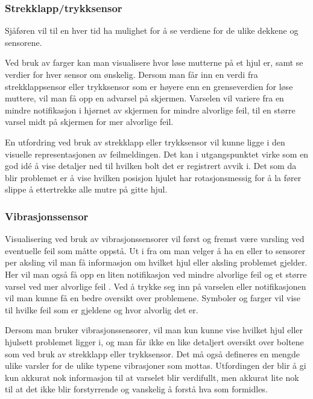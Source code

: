 \subsubsection{Strekklapp/trykksensor}
Sjåføren vil til en hver tid ha mulighet for å se verdiene for de ulike dekkene 
og sensorene. 

Ved bruk av farger kan man visualisere hvor løse mutterne på et hjul er, samt se 
verdier for hver sensor om ønskelig. Dersom man får inn en verdi fra 
strekklappsensor eller trykksensor som er høyere enn en grenseverdien for løse 
muttere, vil man få opp en advarsel på skjermen. Varselen vil variere fra en 
mindre notifikasjon i hjørnet av skjermen for mindre alvorlige feil, til en 
større varsel midt på skjermen for mer alvorlige feil.

En utfordring ved bruk av strekklapp eller trykksensor vil kunne ligge i den 
visuelle representasjonen av feilmeldingen. Det kan i utgangspunktet virke som 
en god idé å vise detaljer ned til hvilken bolt det er registrert avvik i. Det 
som da blir problemet er å vise hvilken posisjon hjulet har rotasjonsmessig for 
å la fører slippe å ettertrekke alle mutre på gitte hjul.

\subsubsection{Vibrasjonssensor}
Visualisering ved bruk av vibrasjonssensorer vil først og fremst være varsling 
ved eventuelle feil som måtte oppstå. Ut i fra om man velger å ha en eller to 
sensorer per aksling vil man få informasjon om hvilket hjul eller aksling 
problemet gjelder. Her vil man også få opp en liten notifikasjon ved mindre 
alvorlige feil og et større varsel ved mer alvorlige feil . Ved å trykke seg 
inn på varselen eller notifikasjonen vil man kunne få en bedre oversikt over 
problemene. Symboler og farger vil vise til hvilke feil som er gjeldene og hvor 
alvorlig det er.

Dersom man bruker vibrasjonssensorer, vil man kun kunne vise hvilket hjul eller 
hjulsett problemet ligger i, og man får ikke en like detaljert oversikt over 
boltene som ved bruk av strekklapp eller trykksensor. Det må også defineres 
en mengde ulike varsler for de ulike typene vibrasjoner som mottas. 
Utfordingen der blir å gi kun akkurat nok informasjon til at varselet blir 
verdifullt, men akkurat lite nok til at det ikke blir forstyrrende og vanskelig 
å forstå hva som formidles.